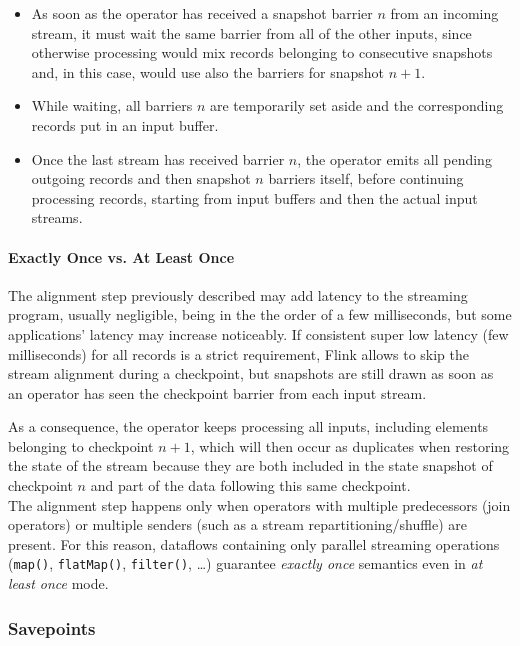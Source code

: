 \begin{itemize}
\item As soon as the operator has received a snapshot barrier $n$ from an incoming stream, it must wait the same barrier from all of the other inputs, since otherwise processing would mix records belonging to consecutive snapshots and, in this case, would use also the barriers for snapshot $n+1$.

\item While waiting, all barriers $n$ are temporarily set aside and the corresponding records put in an input buffer.
    
\item Once the last stream has received barrier $n$, the operator emits all pending outgoing records and then snapshot $n$ barriers itself, before continuing processing records, starting from input buffers and then the actual input streams.
\end{itemize}

\paragraph{Exactly Once vs. At Least Once}

The alignment step previously described may add latency to the streaming program, usually negligible, being in the the order of a few milliseconds, but some applications' latency may increase noticeably. If consistent super low latency (few milliseconds) for all records is a strict requirement, Flink allows to skip the stream alignment during a checkpoint, but snapshots are still drawn as soon as an operator has seen the checkpoint barrier from each input stream.

As a consequence, the operator keeps processing all inputs, including elements belonging to checkpoint $n+1$, which will then occur as duplicates when restoring the state of the stream because they are both included in the state snapshot of checkpoint $n$ and part of the data following this same checkpoint.
\\

The alignment step happens only when operators with multiple predecessors (join operators) or 
multiple senders (such as a stream repartitioning/shuffle) are present. For this reason, dataflows containing only parallel streaming operations (\texttt{map()}, \texttt{flatMap()}, \texttt{filter()}, …) guarantee \textit{exactly once} semantics even in \textit{at least once} mode.

\subsubsection{Savepoints}

